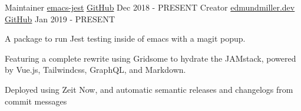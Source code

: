 \begin{cventries}
	\cventry
	{Maintainer} %
	{\href{https://github.com/emiller88/emacs-jest}{emacs-jest}} %
	{\href{https://github.com/emiller88/emacs-jest}{GitHub}} %
	{Dec 2018 - PRESENT} %
	{Creator} %
	{\href{https://github.com/emiller88/edmundmiller.dev}{edmundmiller.dev}} %
	{\href{https://github.com/Emiller88/edmundmiller.dev}{GitHub}} %
	{Jan 2019 - PRESENT} %
	{
		\begin{cvitems} %
			\item {A package to run Jest testing inside of emacs with a magit popup.}
			\item {Featuring a complete rewrite using Gridsome to hydrate the JAMstack, powered by Vue.js, Tailwindcss, GraphQL, and Markdown.}
			\item {Deployed using Zeit Now, and automatic semantic releases and
                    changelogs from commit messages}
		\end{cvitems}
	}

\end{cventries}
